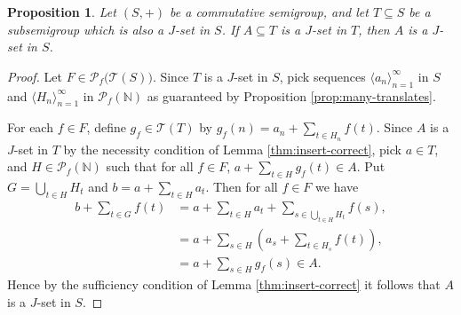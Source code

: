 \documentclass[12pt]{article}
\theoremstyle{plain}
\newtheorem{prop}[thm]{Proposition}
\theoremstyle{definition}
\newcommand{\la}{\langle}
\newcommand{\ra}{\rangle}
\newcommand{\bbN}{\mathbb{N}}
\newcommand{\calT}{\mathcal{T}}
\newcommand{\Pf}{\mathcal{P}_f}
\begin{document}
\begin{prop}
  \label{prop:jsets-lift}
  Let $(S, +)$ be a commutative semigroup, and let $T \subseteq S$
  be a subsemigroup which is also a $J$-set in $S$. 
  If $A \subseteq T$ is a $J$-set in $T$, then $A$ is a $J$-set in $S$.
\end{prop}
\begin{proof}
  Let $F \in \Pf\bigl(\calT(S)\bigr)$.
  Since $T$ is a $J$-set in $S$, pick sequences $\la a_n
  \ra_{n=1}^\infty$ in $S$ and $\la H_n \ra_{n=1}^\infty$ in
  $\Pf(\bbN)$ as guaranteed by Proposition \ref{prop:many-translates}.

  For each $f \in F$, define $g_f \in \calT(T)$ by $g_f(n) = a_n + \sum_{t \in H_n} f(t)$. 
  Since $A$ is a $J$-set in $T$ by the necessity condition of Lemma \ref{thm:insert-correct}, pick $a \in T$, and $H \in
  \Pf(\bbN)$ such that for all $f \in F$, $a + \sum_{t \in H} g_f(t) \in A$. 
  Put $G = \bigcup_{t \in H} H_t$ and $b = a + \sum_{t \in H} a_t$. 
  Then for all $f \in F$ we have
  \begin{align*}
    b + \sum_{t \in G} f(t) &= a + \sum_{t \in H} a_t + \sum_{s \in
      \bigcup_{t \in H} H_t} f(s), \\
    &= a + \sum_{s \in H}(a_s + \sum_{t \in H_s} f(t)), \\
    &= a + \sum_{s \in H} g_f(s) \in A.
  \end{align*}
  Hence by the sufficiency condition of Lemma \ref{thm:insert-correct} it follows that $A$ is a $J$-set in $S$. 
\end{proof}
\end{document}
